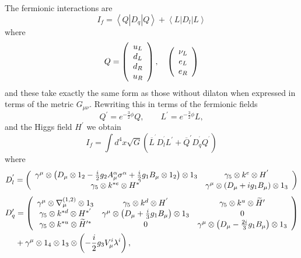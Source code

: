 \documentclass[12pt]{article}%
\begin{document}
The fermionic interactions are
\[
I_{f}=\left\langle Q\left\vert D_{q}\right\vert Q\right\rangle +\left\langle
L\left\vert D_{l}\right\vert L\right\rangle
\]
where
\[
Q=\left(
\begin{array}
[c]{c}%
u_{L}\\
d_{L}\\
d_{R}\\
u_{R}%
\end{array}
\right)  ,\quad\left(
\begin{array}
[c]{c}%
\nu_{L}\\
e_{L}\\
e_{R}%
\end{array}
\right)
\]
and these take exactly the same form as those without dilaton when expressed
in terms of the metric $G_{\mu\nu}$. Rewriting this in terms of the fermionic
fields
\[
Q^{\prime}=e^{-\frac{3}{2}\phi}Q,\qquad L^{\prime}=e^{-\frac{3}{2}\phi}L,
\]
and the Higgs field $H^{\prime}$ we obtain%
\[
I_{f}=\int d^{4}x\sqrt{G}\left(  \overline{L}^{^{\prime}}D_{l}^{^{\prime}%
}L^{\prime}+\overline{Q}^{\prime}D_{q}^{^{\prime}}Q^{^{\prime}}\right)
\]
where \cite{ACAC}
\[
D_{l}^{^{\prime}}=\left(
\begin{array}
[c]{cc}%
\gamma^{\mu}\otimes\left(  D_{\mu}\otimes1_{2}-\frac{i}{2}g_{2}A_{\mu}%
^{\alpha}\sigma^{\alpha}+\frac{i}{2}g_{1}B_{\mu}\otimes1_{2}\right)
\otimes1_{3} & \gamma_{5}\otimes k^{e}\otimes H^{^{\prime}}\\
\gamma_{5}\otimes k^{\ast e}\otimes H^{\ast^{\prime}} & \gamma^{\mu}%
\otimes\left(  D_{\mu}+ig_{1}B_{\mu}\right)  \otimes1_{3}%
\end{array}
\right)
\]%
\begin{align*}
D_{q}^{\prime}  &  =\left(
\begin{array}
[c]{ccc}%
\gamma^{\mu}\otimes\nabla_{\mu}^{\left(  1,2\right)  }\otimes1_{3} &
\gamma_{5}\otimes k^{d}\otimes H^{^{\prime}} & \gamma_{5}\otimes k^{u}%
\otimes\widetilde{H}^{\prime}\\
\gamma_{5}\otimes k^{\ast d}\otimes H^{\ast^{\prime}} & \gamma^{\mu}%
\otimes\left(  D_{\mu}+\frac{i}{3}g_{1}B_{\mu}\right)  \otimes1_{3} & 0\\
\gamma_{5}\otimes k^{\ast u}\otimes\widetilde{H}^{\prime\ast} & 0 &
\gamma^{\mu}\otimes\left(  D_{\mu}-\frac{2i}{3}g_{1}B_{\mu}\right)
\otimes1_{3}%
\end{array}
\right) \\
&  +\gamma^{\mu}\otimes1_{4}\otimes1_{3}\otimes\left(  -\frac{i}{2}g_{3}%
V_{\mu}^{i}\lambda^{i}\right)  ,
\end{align*}
\end{document}
